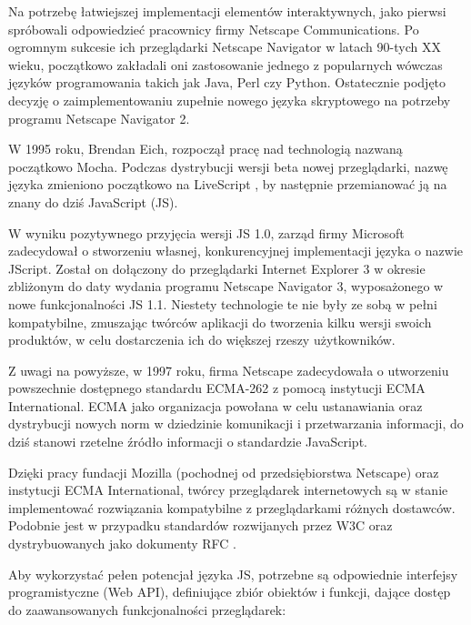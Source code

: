 Na potrzebę łatwiejszej implementacji elementów interaktywnych, jako pierwsi spróbowali odpowiedzieć pracownicy firmy Netscape Communications. Po ogromnym sukcesie ich przeglądarki Netscape Navigator w latach 90-tych XX wieku, początkowo zakładali oni zastosowanie jednego z popularnych wówczas języków programowania takich jak Java, Perl czy Python. Ostatecznie podjęto decyzję o zaimplementowaniu zupełnie nowego języka skryptowego na potrzeby programu Netscape Navigator 2.

W 1995 roku, Brendan Eich, rozpoczął pracę nad technologią nazwaną początkowo Mocha. Podczas dystrybucji wersji beta nowej przeglądarki, nazwę języka zmieniono początkowo na LiveScript , by następnie przemianować ją na znany do dziś JavaScript (JS).

W wyniku pozytywnego przyjęcia wersji JS 1.0, zarząd firmy Microsoft zadecydował o stworzeniu własnej, konkurencyjnej implementacji języka o nazwie JScript. Został on dołączony do przeglądarki Internet Explorer 3 w okresie zbliżonym do daty wydania programu Netscape Navigator 3, wyposażonego w nowe funkcjonalności JS 1.1. Niestety technologie te nie były ze sobą w pełni kompatybilne, zmuszając twórców aplikacji do tworzenia kilku wersji swoich produktów, w celu dostarczenia ich do większej rzeszy użytkowników.

Z uwagi na powyższe, w 1997 roku, firma Netscape zadecydowała o utworzeniu powszechnie dostępnego standardu ECMA-262 z pomocą instytucji ECMA International. ECMA jako organizacja powołana w celu ustanawiania oraz dystrybucji nowych norm w dziedzinie komunikacji i przetwarzania informacji, do dziś stanowi rzetelne źródło informacji o standardzie JavaScript.

Dzięki pracy fundacji Mozilla (pochodnej od przedsiębiorstwa Netscape) oraz instytucji ECMA International, twórcy przeglądarek internetowych są w stanie implementować rozwiązania kompatybilne z przeglądarkami różnych dostawców. Podobnie jest w przypadku standardów rozwijanych przez W3C oraz dystrybuowanych jako dokumenty RFC \cite{js.history}.

Aby wykorzystać pełen potencjał języka JS, potrzebne są odpowiednie interfejsy programistyczne (Web API), definiujące zbiór obiektów i funkcji, dające dostęp do zaawansowanych funkcjonalności przeglądarek:


